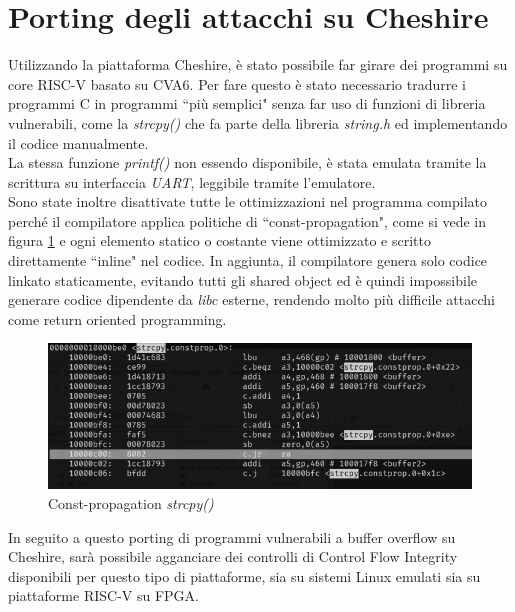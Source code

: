 \section*{Porting degli attacchi su Cheshire}
Utilizzando la piattaforma Cheshire, è stato possibile far girare dei programmi su core RISC-V basato su CVA6. Per fare questo è stato necessario tradurre i programmi C in programmi ``più semplici" senza far uso di funzioni di libreria vulnerabili, come la \textit{strcpy()} che fa parte della libreria \textit{string.h} ed implementando il codice manualmente.\\
La stessa funzione \textit{printf()} non essendo disponibile, è stata emulata tramite la scrittura su interfaccia \textit{UART}, leggibile tramite l'emulatore.\\
\newline
Sono state inoltre disattivate tutte le ottimizzazioni nel programma compilato perché il compilatore applica politiche di ``const-propagation", come si vede in figura \ref{ref:constprop} e ogni elemento statico o costante viene ottimizzato e scritto direttamente ``inline" nel codice. In aggiunta, il compilatore genera solo codice linkato staticamente, evitando tutti gli shared object ed è quindi impossibile generare codice dipendente da \textit{libc} esterne, rendendo molto più difficile attacchi come return oriented programming.
\FloatBarrier
\vspace{1cm}
\begin{figure}[!htbp]
    \centering
    \includegraphics[width=1\linewidth]{images/strcpy-constprop.png}
    \caption{Const-propagation \textit{strcpy()}}
    \label{ref:constprop}
\end{figure}
\vspace{1cm}
\FloatBarrier
In seguito a questo porting di programmi vulnerabili a buffer overflow su Cheshire, sarà possibile agganciare dei controlli di Control Flow Integrity disponibili per questo tipo di piattaforme, sia su sistemi Linux emulati sia su piattaforme RISC-V su FPGA.